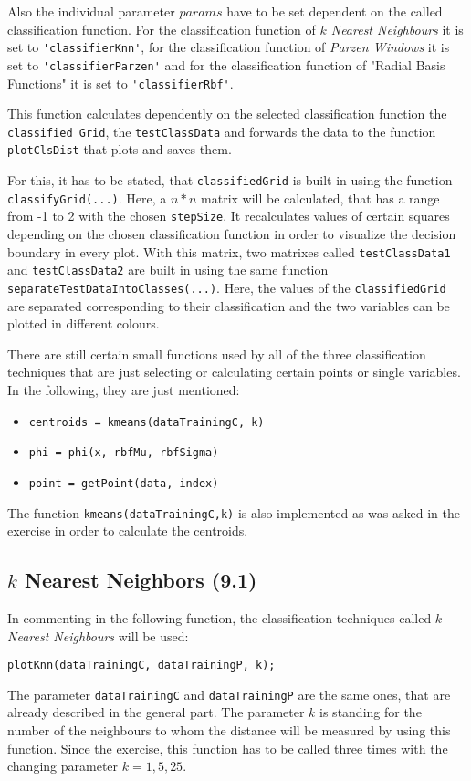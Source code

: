 \documentclass[a4paper,headings=small]{scrartcl}
\begin{document}
Also the individual parameter $params$ have to be set dependent on the called classification function.
For the classification function of \emph{$k$ Nearest Neighbours} it is set to \verb='classifierKnn'=,
for the classification function of \emph{Parzen Windows} it is set to \verb='classifierParzen'=
and for the classification function of "Radial Basis Functions" it is set to \verb='classifierRbf'=.

This function calculates dependently on the selected classification function the \verb=classified Grid=,
the \verb=testClassData= and forwards the data to the function \verb=plotClsDist= that plots and saves them.

For this, it has to be stated, that \verb=classifiedGrid= is built in using the function \verb=classifyGrid(...)=.
Here, a $n * n$ matrix will be calculated, that has a range from -1 to 2 with the chosen \verb=stepSize=.
It recalculates values of certain squares depending on the chosen classification function
in order to visualize the decision boundary in every plot.
With this matrix, two matrixes called \verb=testClassData1= and \verb=testClassData2= are built in using
the same function \verb=separateTestDataIntoClasses(...)=.
Here, the values of the \verb=classifiedGrid= are separated corresponding to their classification
and the two variables can be plotted in different colours.

There are still certain small functions used by all of the three classification techniques
that are just selecting or calculating certain points or single variables.
In the following, they are just mentioned:

\begin{itemize}
	\item \verb#centroids = kmeans(dataTrainingC, k)#
	\item \verb#phi = phi(x, rbfMu, rbfSigma)#
	\item \verb#point = getPoint(data, index)#
\end{itemize}

The function \verb=kmeans(dataTrainingC,k)= is also implemented as was asked in the exercise in order to calculate the centroids.


\subsection{$k$ Nearest Neighbors (9.1)}
In commenting in the following function, the classification techniques called \emph{$k$ Nearest Neighbours} will be used:
\begin{verbatim}
plotKnn(dataTrainingC, dataTrainingP, k);
\end{verbatim}
The parameter \verb=dataTrainingC= and \verb=dataTrainingP= are the same ones, that are already described in the general part.
The parameter $k$ is standing for the number of the neighbours to whom the distance will be measured by using this function.
Since the exercise, this function has to be called three times with the changing parameter $k = 1, 5, 25$.
\end{document}

